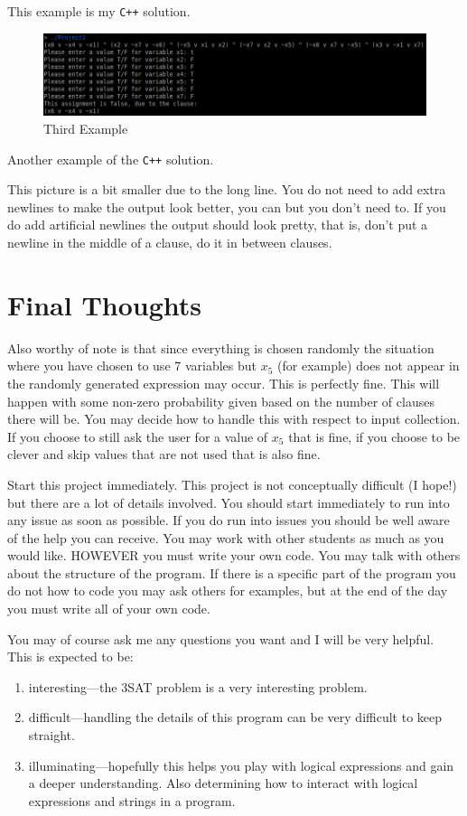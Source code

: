 \documentclass{article}
\begin{document}
This example is my \texttt{C++} solution. 

\begin{figure}[H]
  \centering
  \includegraphics[width=\linewidth]{Ex3}
  \caption{Third Example}
  \label{fig:Ex3}
\end{figure}

Another example of the \texttt{C++} solution.

This picture is a bit smaller due to the long line. You do not need to add extra
newlines to make the output look better, you can but you don't need to. If you
do add artificial newlines the output should look pretty, that is, don't put a
newline in the middle of a clause, do it in between clauses.

\section{Final Thoughts}
Also worthy of note is that since everything is chosen randomly the situation
where you have chosen to use 7 variables but $x_5$ (for example) does not appear
in the randomly generated expression may occur. This is perfectly fine. This
will happen with some non-zero probability given based on the number of clauses
there will be. You may decide how to handle this with respect to input
collection. If you choose to still ask the user for a value of $x_5$ that is
fine, if you choose to be clever and skip values that are not used that is also
fine.

Start this project immediately. This project is not conceptually difficult (I
hope!) but there are a lot of details involved. You should start immediately to
run into any issue as soon as possible. If you do run into issues you should be
well aware of the help you can receive. You may work with other students as much
as you would like. HOWEVER you must write your own code. You may talk with
others about the structure of the program. If there is a specific part of the
program you do not how to code you may ask others for examples, but at the end
of the day you must write all of your own code.

You may of course ask me any questions you want and I will be very helpful. This
is expected to be:
\begin{enumerate}
  \item interesting---the 3SAT problem is a very interesting problem.

  \item difficult---handling the details of this program can be very difficult
  to keep straight.

  \item illuminating---hopefully this helps you play with logical expressions
  and gain a deeper understanding. Also determining how to interact with logical
  expressions and strings in a program.
\end{enumerate}
\end{document}
